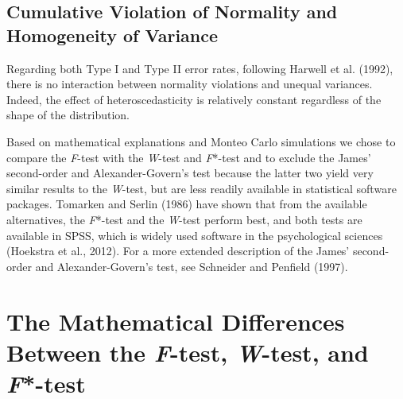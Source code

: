\documentclass[man,floatsintext]{apa6}
\begin{document}
\hypertarget{cumulative-violation-of-normality-and-homogeneity-of-variance}{%
\subsection{Cumulative Violation of Normality and Homogeneity of Variance}\label{cumulative-violation-of-normality-and-homogeneity-of-variance}}

Regarding both Type I and Type II error rates, following Harwell et al. (1992), there is no interaction between normality violations and unequal variances. Indeed, the effect of heteroscedasticity is relatively constant regardless of the shape of the distribution.

Based on mathematical explanations and Monteo Carlo simulations we chose to compare the \emph{F}-test with the \emph{W}-test and \emph{F}*-test and to exclude the James' second-order and Alexander-Govern's test because the latter two yield very similar results to the \emph{W}-test, but are less readily available in statistical software packages. Tomarken and Serlin (1986) have shown that from the available alternatives, the \emph{F}*-test and the \emph{W}-test perform best, and both tests are available in SPSS, which is widely used software in the psychological sciences (Hoekstra et al., 2012). For a more extended description of the James' second-order and Alexander-Govern's test, see Schneider and Penfield (1997).

\hypertarget{the-mathematical-differences-between-the-f-test-w-test-and-f-test}{%
\section{\texorpdfstring{The Mathematical Differences Between the \emph{F}-test, \emph{W}-test, and \emph{F}*-test}{The Mathematical Differences Between the F-test, W-test, and F*-test}}\label{the-mathematical-differences-between-the-f-test-w-test-and-f-test}}
\end{document}
